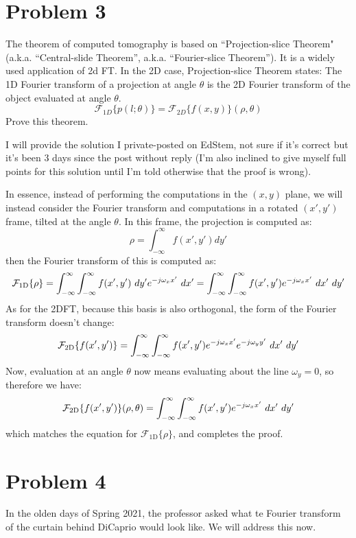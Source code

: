 \documentclass[10pt]{article}
\begin{document}
	\section*{Problem 3}
	The theorem of computed tomography is based on ``Projection-slice Theorem" (a.k.a. ``Central-slide Theorem'', 
	a.k.a. ``Fourier-slice Theorem''). It is a widely used application of 2d FT. In the 2D case, Projection-slice 
	Theorem states: The 1D Fourier transform of a projection at angle \( \theta \) is the 2D Fourier transform 
	of the object evaluated at angle \( \theta \).
	\[
	\mathcal F_{1D}\{p(l; \theta)\}  = \mathcal F_{2D}\{f(x, y)\} (\rho, \theta)
	\] 
	Prove this theorem. 

	\begin{solution}
		I will provide the solution I private-posted on EdStem, not sure if it's correct but it's been 3 days 
		since the post without reply (I'm also inclined to give myself full points for this solution until I'm 
		told otherwise that the proof is wrong). 

		In essence, instead of performing the computations in the \( (x, y) \) plane, we will instead consider 
		the Fourier transform and computations in a rotated \( (x', y') \) frame, tilted at the angle 
		\( \theta \). In this frame, the projection is computed as:
		\[
		\rho = \int_{-\infty}^{\infty} f(x', y') dy' 
		\] 
		then the Fourier transform of this is computed as:
		\[
		\mathcal F_{\text{1D}}\{\rho\}  = \int_{-\infty}^{\infty} \int_{-\infty}^{\infty} 
		f(x', y') \ d y' e^{-j \omega_x x'} \ d x' = \int_{-\infty}^{\infty} 
		\int_{-\infty}^{\infty} f(x', y') e^{-j \omega_x x'} \ d x' \ d y'
		\] 
		As for the 2DFT, because this basis is also orthogonal, the form of the Fourier transform doesn't 
		change:
		\[
		\mathcal F_{\text{2D}}\{f(x', y')\} = \int_{-\infty}^{\infty} \int_{-\infty}^{\infty} 
		f(x', y') e^{-j \omega_x x'} e^{-j \omega_y y'} \ d x' \ d y'
		\] 
		Now, evaluation at an angle \( \theta \) now means evaluating about the line \( \omega_y = 0 \), so therefore 
		we have:
		\[
		\mathcal F_{\text{2D}}\{f(x', y')\}(\rho, \theta) = \int_{-\infty}^{\infty} \int_{-\infty}^{\infty} 
		f(x', y') e^{-j \omega_x x'} \ d x' \ d y'
		\] 
		which matches the equation for \( \mathcal F_{\text{1D}}\{\rho\}  \), and completes the proof. 
	\end{solution}
	\pagebreak
	\section*{Problem 4}
	In the olden days of Spring 2021, the professor asked what te Fourier transform of the curtain behind DiCaprio 
	would look like. We will address this now. 
\end{document}

